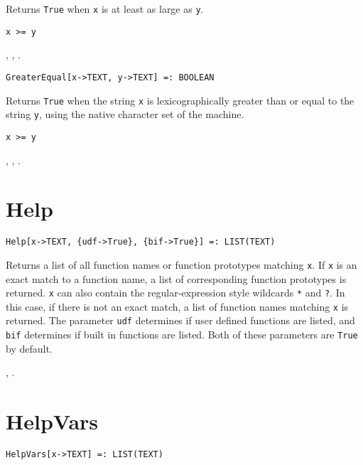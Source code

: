 \noindent
Returns \verb+True+ when \verb+x+ is at least as large as \verb+y+.

\shortform \verb+x >= y+

\seealso {},
, .

\begin{verbatim}
GreaterEqual[x->TEXT, y->TEXT] =: BOOLEAN 
\end{verbatim}

\noindent
Returns \verb+True+ when the string \verb+x+ is lexicographically greater than
or equal to the string \verb+y+, using the native character set of the
machine.

\shortform \verb+x >= y+

\seealso {},
, .


\section*{Help}\label{PrimHelp}
\begin{verbatim}
Help[x->TEXT, {udf->True}, {bif->True}] =: LIST(TEXT) 
\end{verbatim}

\noindent
Returns a list of all function names or function prototypes matching
\verb+x+.  If \verb+x+ is an exact match to a function name, a list of
corresponding function prototypes is returned.  \verb+x+ can also
contain the regular-expression style wildcards \verb+*+ and \verb+?+.
In this case, if there is not an exact match, a list of function names
matching \verb+x+ is returned.  The parameter \verb+udf+ determines if
user defined functions are listed, and \verb+bif+ determines if built
in functions are listed.  Both of these parameters are \verb+True+ by
default.

\seealso {},
.


\section*{HelpVars}\label{PrimHelpVars}
\begin{verbatim}
HelpVars[x->TEXT] =: LIST(TEXT) 
\end{verbatim}

